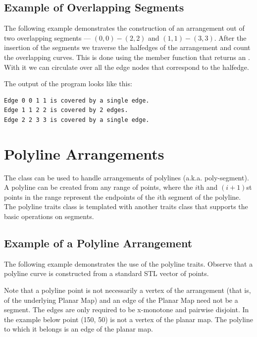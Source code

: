 \subsection{Example of Overlapping Segments}
\label{ssec:example2}
The following example demonstrates the construction of an
arrangement out of two overlapping segments --- $(0,0)-(2,2)$
and $(1,1)-(3,3)$.
After the insertion of the segments we
traverse the halfedges
of the arrangement and count the overlapping curves.
This is done using the  member function that returns an
. With it we can circulate
over all the edge nodes that correspond to the halfedge.


The output of the program looks like this:
\begin{verbatim}
Edge 0 0 1 1 is covered by a single edge.
Edge 1 1 2 2 is covered by 2 edges.
Edge 2 2 3 3 is covered by a single edge.
\end{verbatim}

\section{Polyline Arrangements}

The  class can be used to 
handle arrangements of polylines (a.k.a. poly-segment). A polyline can be
created from any range of points, where the $i$th and $(i+1)$st points 
in the range represent the endpoints of the $i$th segment of the polyline.
The polyline traits class is templated with another traits class that supports
the basic operations on segments. 

\subsection{Example of a Polyline Arrangement}
\label{ssec:example10}
The following example demonstrates the use of the polyline traits.
Observe that a polyline curve is constructed from a standard STL vector
of points.

Note that a polyline point is not necessarily a vertex of the arrangement 
(that is, of the underlying Planar Map) and an edge of the Planar Map need 
not be a segment. The edges are only required to be x-monotone and pairwise 
disjoint. In the example below point (150, 50) is not a vertex of the planar 
map. The polyline to which it belongs is an edge of the planar map.

